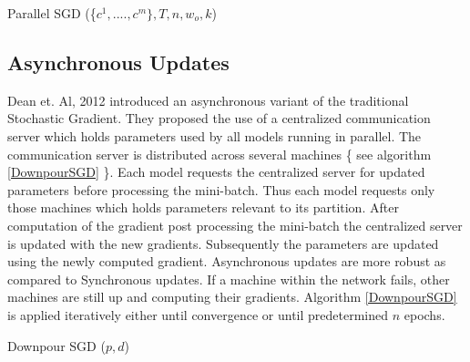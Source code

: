 \documentclass[sigconf]{acmart}
\begin{document}
\begin{algorithm}

\caption{Parallel SGD (\{$ c^1,....,c^m\} , T, n, w_o,k$)}\label{SGD}

\begin{algorithmic}[1] 
\EndFor
{}
\EndFor
{}

\end{algorithmic}

\end{algorithm}


\subsection{Asynchronous Updates}

Dean et. Al, 2012 \cite{Dean} introduced an asynchronous variant of the traditional Stochastic Gradient. They proposed the use of a centralized communication server which holds parameters used by all models running in parallel. The communication server is distributed across several machines \{ see algorithm \ref{DownpourSGD} \}. Each model requests the centralized server for updated parameters before processing the mini-batch. Thus each model requests only those machines which holds parameters relevant to its partition. After computation of the gradient post processing the mini-batch the centralized server is updated with the new gradients. Subsequently the parameters are updated using the newly computed gradient. Asynchronous updates are more robust as compared to Synchronous updates. If a machine within the network fails, other machines are still up and computing their gradients. Algorithm \ref{DownpourSGD} is applied iteratively either until convergence or until predetermined $n$ epochs.  

\begin{algorithm}[htbp]

\caption{Downpour SGD ($p,d$)}\label{DownpourSGD}

\begin{algorithmic}[1]
\EndFor
{}
\EndFor
\end{algorithmic}

\end{algorithm}
\end{document}
